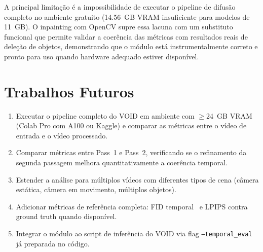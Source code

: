\documentclass[conference]{IEEEtran}
\begin{document}
A principal limitação é a impossibilidade de executar o pipeline de difusão completo no ambiente gratuito (14.56~GB VRAM insuficiente para modelos de 11~GB). O inpainting com OpenCV supre essa lacuna com um substituto funcional que permite validar a coerência das métricas com resultados reais de deleção de objetos, demonstrando que o módulo está instrumentalmente correto e pronto para uso quando hardware adequado estiver disponível.

\section{Trabalhos Futuros}

\begin{enumerate}
    \item Executar o pipeline completo do VOID em ambiente com $\geq$24~GB VRAM (Colab Pro com A100 ou Kaggle) e comparar as métricas entre o vídeo de entrada e o vídeo processado.
    \item Comparar métricas entre Pass~1 e Pass~2, verificando se o refinamento da segunda passagem melhora quantitativamente a coerência temporal.
    \item Estender a análise para múltiplos vídeos com diferentes tipos de cena (câmera estática, câmera em movimento, múltiplos objetos).
    \item Adicionar métricas de referência completa: FID temporal~\cite{fid} e LPIPS contra ground truth quando disponível.
    \item Integrar o módulo ao script de inferência do VOID via flag \texttt{--temporal\_eval} já preparada no código.
\end{enumerate}
\end{document}

